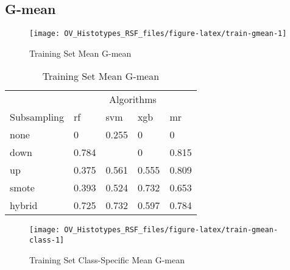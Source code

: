\documentclass[
]{report}
\begin{document}
\subsection{G-mean}\label{g-mean}

\begin{figure}[H]

{\centering \texttt{[image: OV\_Histotypes\_RSF\_files/figure-latex/train-gmean-1]} 

}

\caption{Training Set Mean G-mean}\label{fig:train-gmean}
\end{figure}

\begin{table}

\caption{\label{tab:train-gmean-table}Training Set Mean G-mean}
\centering
\begin{tabular}[t]{l|l|l|l|l}
\hline
\multicolumn{1}{c|}{ } & \multicolumn{4}{c}{Algorithms} \\
\cline{2-5}
Subsampling & rf & svm & xgb & mr\\
\hline
none & 0 & 0.255 & 0 & 0\\
\hline
down & 0.784 & \cellcolor[HTML]{90ee90}{0.831} & 0 & 0.815\\
\hline
up & 0.375 & 0.561 & 0.555 & 0.809\\
\hline
smote & 0.393 & 0.524 & 0.732 & 0.653\\
\hline
hybrid & 0.725 & 0.732 & 0.597 & 0.784\\
\hline
\end{tabular}
\end{table}

\begin{figure}[H]

{\centering \texttt{[image: OV\_Histotypes\_RSF\_files/figure-latex/train-gmean-class-1]} 

}

\caption{Training Set Class-Specific Mean G-mean}\label{fig:train-gmean-class}
\end{figure}
\end{document}
